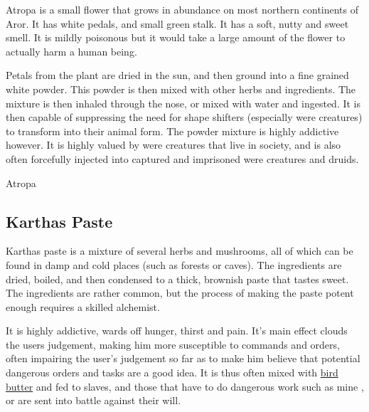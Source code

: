 Atropa is a small flower that grows in abundance on most northern continents
of Aror. It has white pedals, and small green stalk. It has a soft, nutty and
sweet smell. It is mildly poisonous but it would take a large amount of the
flower to actually harm a human being.

Petals from the plant are dried in the sun, and then ground into a fine
grained white powder. This powder is then mixed with other herbs and
ingredients. The mixture is then inhaled through the nose, or mixed with water
and ingested. It is then capable of suppressing the need for shape shifters
(especially were creatures) to transform into their animal form. The powder
mixture is highly addictive however. It is highly valued by were creatures
that live in society, and is also often forcefully injected into captured and
imprisoned were creatures and druids.

\begin{35e}{Atropa}
\end{35e}

\subsection{Karthas Paste}
\label{sec:Karthas Paste}

Karthas paste is a mixture of several herbs and mushrooms, all of which can be
found in damp and cold places (such as forests or caves). The ingredients are
dried, boiled, and then condensed to a thick, brownish paste that tastes sweet.
The ingredients are rather common, but the process of making the paste potent
enough requires a skilled alchemist.

It is highly addictive, wards off hunger, thirst and pain. It's main effect
clouds the users judgement, making him more susceptible to commands and
orders, often impairing the user's judgement so far as to make him believe
that potential dangerous orders and tasks are a good idea. It is thus often
mixed with \hyperref[sec:Food]{bird butter} and fed to slaves, and those that
have to do dangerous work such as mine , or are sent
into battle against their will.

